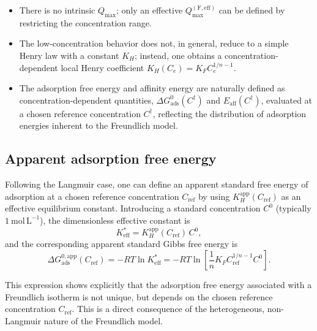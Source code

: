 \documentclass[12pt]{article}
\begin{document}
	\begin{itemize}
		\item There is no intrinsic \(Q_{\max}\); only an effective
		\(Q_{\max}^{\mathrm{(F,eff)}}\) can be defined by restricting the
		concentration range.
		
		\item The low-concentration behavior does not, in general, reduce
		to a simple Henry law with a constant \(K_H\); instead, one obtains
		a concentration-dependent local Henry coefficient
		\(K_H(C_e) = K_F C_e^{1/n - 1}\).
		
		\item The adsorption free energy and affinity energy are naturally
		defined as concentration-dependent quantities,
		\(\Delta G_{\mathrm{ads}}^{0}(C^{\dagger})\) and
		\(E_{\mathrm{aff}}(C^{\dagger})\), evaluated at a chosen reference
		concentration \(C^{\dagger}\), reflecting the distribution of
		adsorption energies inherent to the Freundlich model.
	\end{itemize}
	
	\subsection{Apparent adsorption free energy}
	
	Following the Langmuir case, one can define an apparent standard free energy
	of adsorption at a chosen reference concentration $C_{\mathrm{ref}}$ by using
	$K_H^{\mathrm{app}}(C_{\mathrm{ref}})$ as an effective equilibrium constant.
	Introducing a standard concentration $C^0$ (typically
	$1~\mathrm{mol\,L^{-1}}$), the dimensionless effective constant is
	\begin{equation}
		K_{\mathrm{eff}}^{\ast}
		= K_H^{\mathrm{app}}(C_{\mathrm{ref}})\, C^0,
	\end{equation}
	and the corresponding apparent standard Gibbs free energy is
	\begin{equation}
		\Delta G_{\mathrm{ads}}^{0,\mathrm{app}}(C_{\mathrm{ref}})
		= - R T \ln K_{\mathrm{eff}}^{\ast}
		= - R T \ln\!\left[ \frac{1}{n} K_F C_{\mathrm{ref}}^{1/n - 1} C^0 \right].
	\end{equation}
	
	This expression shows explicitly that the adsorption free energy associated
	with a Freundlich isotherm is not unique, but depends on the chosen reference
	concentration $C_{\mathrm{ref}}$. This is a direct consequence of the
	heterogeneous, non-Langmuir nature of the Freundlich model.
	
\end{document}
